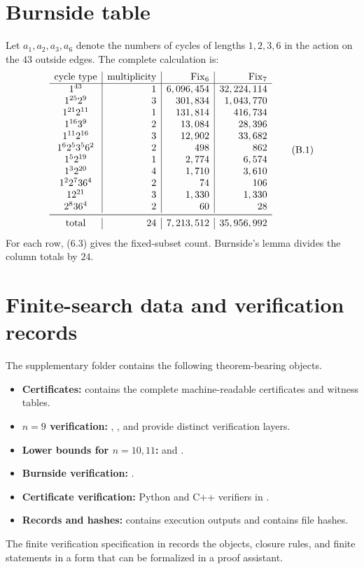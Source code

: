 \documentclass[11pt]{article}
\numberwithin{equation}{section}
\begin{document}
\section{Burnside table}\label{app:burnside}
Let $a_1,a_2,a_3,a_6$ denote the numbers of cycles of lengths $1,2,3,6$ in the action on the $43$ outside edges. The complete calculation is:
\[
\begin{array}{c|r|r|r}
\text{cycle type}&\text{multiplicity}&\operatorname{Fix}_6&\operatorname{Fix}_7\\ \hline
1^{43}&1&6,096,454&32,224,114\\
1^{25}2^9&3&301,834&1,043,770\\
1^{21}2^{11}&1&131,814&416,734\\
1^{16}3^9&2&13,084&28,396\\
1^{11}2^{16}&3&12,902&33,682\\
1^6 2^5 3^5 6^2&2&498&862\\
1^5 2^{19}&1&2,774&6,574\\
1^3 2^{20}&4&1,710&3,610\\
1^2 2^7 3 6^4&2&74&106\\
1 2^{21}&3&1,330&1,330\\
2^8 3 6^4&2&60&28\\
\midrule
\text{total}&24&7,213,512&35,956,992
\end{array}
\tag{B.1}
\]
For each row, (6.3) gives the fixed-subset count. Burnside's lemma divides the column totals by $24$.

\section{Finite-search data and verification records}\label{app:records}
The supplementary folder contains the following theorem-bearing objects.

\begin{itemize}
\item \textbf{Certificates:}  contains the complete machine-readable certificates and witness tables.
\item \textbf{$n=9$ verification:} , , and  provide distinct verification layers.
\item \textbf{Lower bounds for $n=10,11$:}  and .
\item \textbf{Burnside verification:} .
\item \textbf{Certificate verification:} Python and C++ verifiers in .
\item \textbf{Records and hashes:}  contains execution outputs and  contains file hashes.
\end{itemize}

The finite verification specification in  records the objects, closure rules, and finite statements in a form that can be formalized in a proof assistant.
\end{document}

